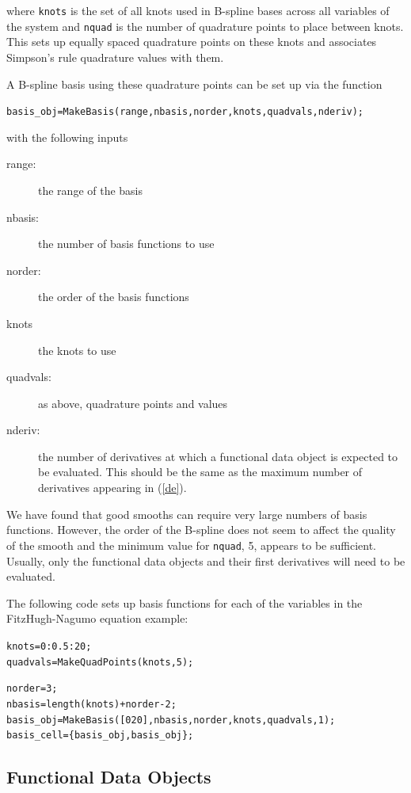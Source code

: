 \documentclass{article}
\newcommand{\nt}    {\noindent}
\begin{document}
\nt where {\tt knots} is the set of all knots used in B-spline bases across all variables of the
system and {\tt nquad} is the number of quadrature points to place between knots. This sets up
equally spaced quadrature points on these knots and associates Simpson's rule quadrature values
with them.

A B-spline basis using these quadrature points can be set
up via the function

\begin{alltt}
basis_obj = MakeBasis(range,nbasis,norder,knots,quadvals,nderiv);
\end{alltt}

\nt with the following inputs

\begin{description}
    \item[range:] the range of the basis
    \item[nbasis:] the number of basis functions to use
    \item[norder:] the order of the basis functions
    \item[knots] the knots to use
    \item[quadvals:] as above, quadrature points and values
    \item[nderiv:] the number of derivatives at which a
    functional data object is expected to be evaluated.
    This should be the same as the maximum number of
    derivatives appearing in (\ref{de}).
\end{description}

We have found that good smooths can require very
large numbers of basis functions. However, the order of the
B-spline does not seem to affect the quality of the smooth
and the minimum value for {\tt nquad}, 5, appears
to be sufficient. Usually, only the functional data objects
and their first derivatives will need to be evaluated.

The following code sets up basis functions for each of the variables in the FitzHugh-Nagumo
equation example:

\begin{alltt}
    knots = 0:0.5:20;
    quadvals = MakeQuadPoints(knots,5);

    norder = 3;
    nbasis = length(knots) + norder - 2;
    basis_obj = MakeBasis([0 20],nbasis,norder,knots,quadvals,1);
    basis_cell = \{basis_obj, basis_obj\};
\end{alltt}

\subsection{Functional Data Objects}
\end{document}
